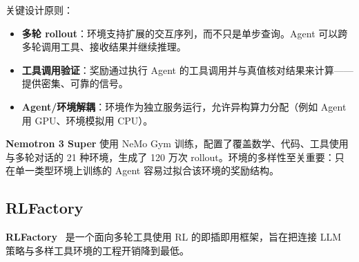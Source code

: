 关键设计原则：
\begin{itemize}
  \item \textbf{多轮 rollout}：环境支持扩展的交互序列，而不只是单步查询。Agent 可以跨多轮调用工具、接收结果并继续推理。
  \item \textbf{工具调用验证}：奖励通过执行 Agent 的工具调用并与真值核对结果来计算——提供密集、可靠的信号。
  \item \textbf{Agent/环境解耦}：环境作为独立服务运行，允许异构算力分配（例如 Agent 用 GPU、环境模拟用 CPU）。
\end{itemize}

\textbf{Nemotron 3 Super} 使用 NeMo Gym 训练，配置了覆盖数学、代码、工具使用与多轮对话的 21 种环境，生成了 120 万次 rollout。环境的多样性至关重要：只在单一类型环境上训练的 Agent 容易过拟合该环境的奖励结构。

\subsection{RLFactory}
\label{subsec:rlfactory}

\textbf{RLFactory}~\cite{rlfactory2025} 是一个面向多轮工具使用 RL 的即插即用框架，旨在把连接 LLM 策略与多样工具环境的工程开销降到最低。

